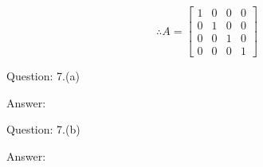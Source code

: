 \documentclass[a4paper]{article}
\begin{document}
\begin{qalist}
		\begin{equation}\label{q6bfinalAns}
			\therefore A = 
				\begin{bmatrix} 
					1 & 0 & 0 & 0 \\
					0 & 1 & 0 & 0 \\
					0 & 0 & 1 & 0 \\
					0 & 0 & 0 & 1
				\end{bmatrix}
		\end{equation}
		

		\item[Question: 7.(a)] \setcounter{equation}{0} 
		\item[Answer:] 
		
		\item[Question: 7.(b)] \setcounter{equation}{0} 
		\item[Answer:] 
		
	\end{qalist}
\end{document}
